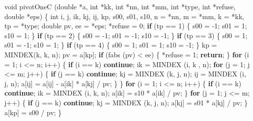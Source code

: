 \documentclass[12pt,]{article}
\newenvironment{Shaded}{\begin{snugshade}}{\end{snugshade}}
\newcommand{\DataTypeTok}[1]{\textcolor[rgb]{0.13,0.29,0.53}{#1}}
\newcommand{\DecValTok}[1]{\textcolor[rgb]{0.00,0.00,0.81}{#1}}
\newcommand{\ControlFlowTok}[1]{\textcolor[rgb]{0.13,0.29,0.53}{\textbf{#1}}}
\newcommand{\NormalTok}[1]{#1}
\begin{document}
\begin{Shaded}
\begin{Highlighting}[]
\DataTypeTok{void}\NormalTok{ pivotOneC (}\DataTypeTok{double}\NormalTok{ *a, }\DataTypeTok{int}\NormalTok{ *kk, }\DataTypeTok{int}\NormalTok{ *nn, }\DataTypeTok{int}\NormalTok{ *mm, }\DataTypeTok{int}\NormalTok{ *type, }\DataTypeTok{int}\NormalTok{ *refuse, }\DataTypeTok{double}\NormalTok{ *eps) \{}
    \DataTypeTok{int}\NormalTok{ i, j, ik, kj, ij, kp, s00, s01, s10, n = *nn, m = *mm, k = *kk, tp = *type;}
    \DataTypeTok{double}\NormalTok{ pv, ee = *eps;}
\NormalTok{    *refuse = }\DecValTok{0}\NormalTok{;}
    \ControlFlowTok{if}\NormalTok{ (tp == }\DecValTok{1}\NormalTok{) \{}
\NormalTok{        s00 = }\DecValTok{-1}\NormalTok{;}
\NormalTok{        s01 = }\DecValTok{1}\NormalTok{;}
\NormalTok{        s10 = }\DecValTok{1}\NormalTok{;}
\NormalTok{    \}}
    \ControlFlowTok{if}\NormalTok{ (tp == }\DecValTok{2}\NormalTok{) \{}
\NormalTok{        s00 = }\DecValTok{-1}\NormalTok{;}
\NormalTok{        s01 = }\DecValTok{-1}\NormalTok{;}
\NormalTok{        s10 = }\DecValTok{-1}\NormalTok{;}
\NormalTok{    \}}
   \ControlFlowTok{if}\NormalTok{ (tp == }\DecValTok{3}\NormalTok{) \{}
\NormalTok{        s00 = }\DecValTok{1}\NormalTok{;}
\NormalTok{        s01 = }\DecValTok{-1}\NormalTok{;}
\NormalTok{        s10 = }\DecValTok{1}\NormalTok{;}
\NormalTok{    \}}
   \ControlFlowTok{if}\NormalTok{ (tp == }\DecValTok{4}\NormalTok{) \{}
\NormalTok{        s00 = }\DecValTok{1}\NormalTok{;}
\NormalTok{        s01 = }\DecValTok{1}\NormalTok{;}
\NormalTok{        s10 = }\DecValTok{-1}\NormalTok{;}
\NormalTok{    \}}
\NormalTok{    kp = MINDEX(k, k, n);}
\NormalTok{    pv = a[kp];}
    \ControlFlowTok{if}\NormalTok{ (fabs (pv) < ee) \{}
\NormalTok{        *refuse = }\DecValTok{1}\NormalTok{; }
        \ControlFlowTok{return}\NormalTok{;}
\NormalTok{    \}}
    \ControlFlowTok{for}\NormalTok{ (i = }\DecValTok{1}\NormalTok{; i <= n; i++) \{}
        \ControlFlowTok{if}\NormalTok{ (i == k) }\ControlFlowTok{continue}\NormalTok{;}
\NormalTok{        ik = MINDEX (i, k , n);}
        \ControlFlowTok{for}\NormalTok{ (j = }\DecValTok{1}\NormalTok{; j <= m; j++) \{}
            \ControlFlowTok{if}\NormalTok{ (j == k) }\ControlFlowTok{continue}\NormalTok{;}
\NormalTok{            kj = MINDEX (k, j, n);}
\NormalTok{            ij = MINDEX (i, j, n);}
\NormalTok{            a[ij] = a[ij] - a[ik] * a[kj] / pv;}
\NormalTok{        \}}
\NormalTok{    \}}
    \ControlFlowTok{for}\NormalTok{ (i = }\DecValTok{1}\NormalTok{; i <= n; i++) \{}
        \ControlFlowTok{if}\NormalTok{ (i == k) }\ControlFlowTok{continue}\NormalTok{;}
\NormalTok{        ik = MINDEX (i, k, n);}
\NormalTok{        a[ik] = s10 * a[ik] / pv;}
\NormalTok{    \}}
    \ControlFlowTok{for}\NormalTok{ (j = }\DecValTok{1}\NormalTok{; j <= m; j++) \{}
        \ControlFlowTok{if}\NormalTok{ (j == k) }\ControlFlowTok{continue}\NormalTok{;}
\NormalTok{        kj = MINDEX (k, j, n);}
\NormalTok{        a[kj] = s01 * a[kj] / pv;}
\NormalTok{    \}}
\NormalTok{    a[kp] = s00 / pv;}
\NormalTok{\}}



\end{Highlighting}
\end{Shaded}
\end{document}
